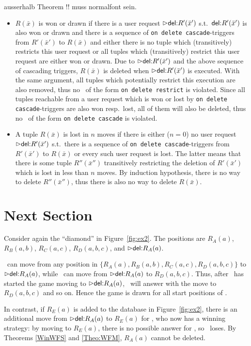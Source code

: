 \documentclass[twoside,11pt]{article}
\theoremstyle{plain}
\begin{document}
ausserhalb Theorem !! muss normalfont sein.
\begin{Proof}
\begin{itemize}
\item $R(\bar x)$ is won or drawn if there is a user request
 $\extev \del R'(\bar x')$ s.t.\ ${\textsf{del:}} R'(\bar x')$ is also won or drawn
 and there is a sequence of \texttt{on delete cascade}-triggers from
 $R'(\bar x')$ to $R(\bar x)$ and either there is no tuple which
 (transitively) restricts this user request or all tuples which
 (transitively) restrict this user request are either won or drawn.
 Due to $\extev \del R'(\bar x')$ and the above sequence
 of cascading triggers, $R(\bar x)$ is deleted when
 $\extev \del R'(\bar x')$ is executed.
 With the same argument, all tuples which potentially restrict this
 execution are also removed, thus no \ric\ of the form
 \texttt{on delete restrict} is violated.
 Since all tuples reachable from a user request which is won or lost by
 \texttt{on delete cascade}-triggers are also won resp.\ lost, all of
 them will also be deleted, thus no \ric\ of the form
 \texttt{on delete cascade} is violated.
\item A tuple $R(\bar x)$ is lost in $n$ moves if there is either
 ($n=0$) no user request $\extev \del R'(\bar x')$ s.t.\ there is a
 sequence of \texttt{on delete cascade}-triggers from $R'(\bar x')$
 to $R(\bar x)$ or every such user request is lost.
 The latter means that there is some tuple $R''(\bar x'')$ transitively
 restricting the deletion of $R'(\bar x')$ which is lost in less than
 $n$ moves. By induction hypothesis, there is no way to delete
 $R''(\bar x'')$, thus there is also no way to delete $R(\bar x)$.
\end{itemize}
\end{Proof}

\section{Next Section}

\begin{Example}
  Consider again the ``diamond'' in Figure~\ref{fig:ex2}.  The
  positions are $R_A(a)$, $R_B(a,b)$, $R_C(a,c)$, $R_D(a,b,c)$, and
  $\extev \del R_A(a)$.  

  \I\ can move from any position in $\{R_A(a), R_B(a,b), R_C(a,c),
  R_D(a,b,c)\}$ to $\extev \del R_A(a)$, while \II\ can move from
  $\extev \del R_A(a)$ to $R_D(a,b,c)$. Thus, after \I\ has started
  the game moving to $\extev \del R_A(a)$, \II\ will answer with the
  move to $R_D(a,b,c)$ and so on. Hence the game is drawn for
  all start positions of \I.

  In contrast, if $R_E(a)$ is added to the database in
  Figure~\ref{fig:ex2}, there is an additional move from $\extev \del
  R_A(a)$ to $R_E(a)$ for \II, who now has a winning strategy: by
  moving to $R_E(a)$, there is no possible answer for \I, so \I\ 
  loses. By Theorems \ref{WinWFS} and \ref{Theo:WFM}, $R_A(a)$ cannot
  be deleted.
\end{Example}
\end{document}
